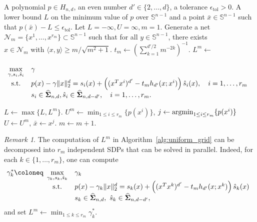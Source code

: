 \documentclass[12pt]{article}
\newcommand{\argmin}{\mathop{\rm argmin}}
\newcommand{\HSOS}{\widehat{\mathbf{\Sigma}}}
\newcommand{\defeq}{\coloneq}
\newcommand{\st}{\text{s.t.}}
\newcommand{\mcN}{\mathcal{N}}
\newcommand{\mbS}{\mathbb{S}}
\theoremstyle{remark}
\newtheorem{remark}{Remark}%
\begin{document}
\begin{algorithm}[!tb]
\caption{Spherical-Cap-Based Algorithm for Minimizing a Form}
\label{alg:uniform_grid}

\newlength{\algmathwidth}
\setlength{\algmathwidth}{\dimexpr\linewidth-\algorithmicindent\relax}
\begin{algorithmic}
\Require A polynomial $p\in H_{n,d}$, an even number $d'\in\{2,\ldots,d\}$, a tolerance $\epsilon_{\text{tol}}>0$.
\Ensure  A lower bound $L$ on the minimum value of $p$ over $\mbS^{n-1}$ and a point $\bar{x}\in\mbS^{n-1}$ such that 
$p(\bar{x})-L\le \epsilon_{\text{tol}}$.
\Initialization Let $L=-\infty, U=\infty, m=1$.
\State Generate a net $\mcN_m=\{x^1,\ldots,x^{r_m}\}\subset\mbS^{n-1}$ such that for all $y\in \mbS^{n-1}$, there exists\\
\hspace*{\algorithmicindent} $x\in \mcN_m$ with $\langle x,y\rangle\ge m/\sqrt{m^2+1}$.
\State $t_m\gets\left(\sum_{k=1}^{d'/2}m^{-2k}\right)^{-1}$.
\State 
$L^m\gets$ \parbox[t]{\algmathwidth}{%
$\begin{array}[t]{cl}
 \max\limits_{\gamma,s_i,\hat{s}_i} & \gamma\\
 \st & p(x)-\gamma\|x\|_2^d= s_{i}(x)+\left((x^Tx^i)^{d'}-t_mh_{d'}(x;x^i)\right)\hat{s}_{i}(x),\quad i=1,\ldots,r_m\\
 & s_{i}\in\HSOS_{n,d},\hat{s}_{i}\in\HSOS_{n,d-d'},\quad i=1,\ldots,r_m.
\end{array}$
}
\State $L\gets\max\{L,L^m\}$.
\State $U^m\gets\min_{1\le i\le r_m}\{p(x^i)\}$, $j\gets\argmin_{1\le i\le r_m}\{p(x^i)\}$
 $U\gets U^m$, $\bar{x}\gets x^{j}$.
\EndIf
\State $m\gets m+1$.
\EndWhile
\State {}
\end{algorithmic}
\end{algorithm}

\begin{remark}\label{remark:uniform_grid}
{The computation of $L^m$ in Algorithm~\ref{alg:uniform_grid} can be decomposed into $r_m$ independent SDPs that can be solved in parallel.
Indeed, for each $k\in\{1,\ldots,r_m\}$, one can compute
\begin{equation*}
\gamma_k^*\defeq
\begin{array}[t]{cl}
\max\limits_{\gamma_k,s_k,\hat{s}_k} & \gamma_k\\
\st & p(x)-\gamma_k\|x\|_2^d= s_{k}(x)+\left((x^Tx^k)^{d'}-t_mh_{d'}(x;x^k)\right)\hat{s}_{k}(x)\\
& s_{k}\in\HSOS_{n,d},\ \hat{s}_{k}\in\HSOS_{n,d-d'},
\end{array}
\end{equation*}
and set $L^m\gets\min_{1\le k\le r_m}\gamma_k^*$.}
\end{remark}
\end{document}
